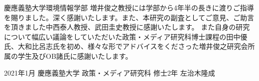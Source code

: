 \begin{acknowledgment}

  慶應義塾大学環境情報学部 増井俊之教授には学部から4年半の長きに渡りご指導を賜りました。深く感謝いたします。また、本研究の副査としてご意見、ご助言を頂きました中西泰人教授、武田圭史教授に感謝いたします。
  また自身の研究について幅広い議論をしていただいた政策・メディア研究科博士課程の田中優氏、大和比呂志氏を初め、様々な形でアドバイスをくださった増井俊之研究会所属の学生及びOB諸氏に感謝いたします。
  \\
  \begin{flushright}
      2021年1月 慶應義塾大学 政策・メディア研究科 修士2年 左治木隆成
  \end{flushright}
  
  \end{acknowledgment}